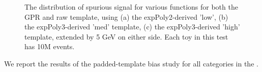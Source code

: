 \begin{figure} 
\begin{center}

\caption{The distribution of spurious signal for various functions for both the GPR and raw template, using (a) the expPoly2-derived 'low', (b) the expPoly3-derived 'med' template, (c) the expPoly3-derived 'high' template, extended by 5 GeV on either side. Each toy in this test has 10M events.}
\label{fig:padded_lowpt_10M_noSig}
\end{center}
\end{figure}


We report the results of the padded-template bias study for all categories in the \Tab{\ref{tab:NoSigSSpadded}}.

